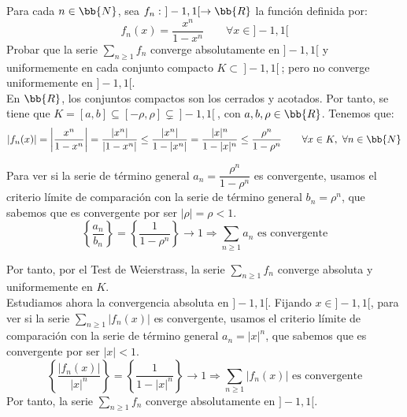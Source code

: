 \begin{ejercicio}
    Para cada $n\in \bb{N}$, sea $f_n:~]-1,1[ \to \bb{R}$ la función definida por:
    \begin{equation*}
        f_n(x) = \frac{x^n}{1-x^n} \qquad \forall x\in]-1,1[
    \end{equation*}
    Probar que la serie $\sum\limits_{n\geq 1}f_n$ converge absolutamente en $]-1,1[$ y uniformemente
    en cada conjunto compacto $K\subset~]-1,1[~$; pero no converge uniformemente en $]-1,1[$.\\
    
    En $\bb{R}$, los conjuntos compactos son los cerrados y acotados. Por tanto, se tiene que $K=[a,b]\subseteq [-\rho, \rho]\subsetneq ~]-1,1[~$, con $a,b,\rho\in \bb{R}$. Tenemos que:
    \begin{equation*}
        |f_n(x)| = \left|\frac{x^n}{1-x^n}\right| = \frac{|x^n|}{|1-x^n|} \leq \frac{|x^n|}{1-|x^n|}
        = \frac{|x|^n}{1-|x|^n} \leq \frac{\rho^n}{1-\rho^n} \qquad \forall x\in K,~\forall n\in \bb{N}
    \end{equation*}

    Para ver si la serie de término general $a_n = \dfrac{\rho^n}{1-\rho^n}$ es convergente,
    usamos el criterio límite de comparación con la serie de término general $b_n = \rho^n$, que sabemos que es convergente por ser $|\rho|=\rho < 1$.
    \begin{equation*}
        \left\{\frac{a_n}{b_n}\right\}
        = \left\{\frac{1}{1-\rho^n}\right\} \to 1 \Longrightarrow \sum_{n\geq 1}a_n \text{ es convergente}
    \end{equation*}

    Por tanto, por el Test de Weierstrass, la serie $\sum\limits_{n\geq 1}f_n$ converge absoluta y uniformemente en $K$.\\

    Estudiamos ahora la convergencia absoluta en $]-1,1[$. Fijando $x\in ]-1,1[$, para ver si
    la serie $\sum\limits_{n\geq 1}|f_n(x)|$ es convergente, usamos el criterio límite de comparación
    con la serie de término general $a_n = |x|^n$, que sabemos que es convergente por ser $|x|<1$.
    \begin{equation*}
        \left\{\frac{|f_n(x)|}{|x|^n}\right\} = \left\{\frac{1}{1-|x|^n}\right\}\to 1 \Longrightarrow \sum_{n\geq 1}|f_n(x)| \text{ es convergente}
    \end{equation*}
    Por tanto, la serie $\sum\limits_{n\geq 1}f_n$ converge absolutamente en $]-1,1[$.\\


\end{ejercicio}

